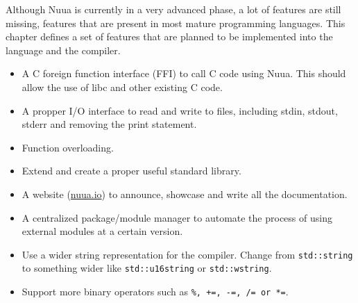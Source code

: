 Although Nuua is currently in a very advanced phase, a lot of features are still missing, features that are present in most
mature programming languages. This chapter defines a set of features that are planned to be implemented into the language and
the compiler.

\begin{itemize}
    \item A C foreign function interface (FFI) to call C code using Nuua. This should allow the use of libc and other existing C code.
    \item A propper I/O interface to read and write to files, including stdin, stdout, stderr and removing the print statement.
    \item Function overloading.
    \item Extend and create a proper useful standard library.
    \item A website (\href{https://nuua.io}{nuua.io}) to announce, showcase and write all the documentation.
    \item A centralized package/module manager to automate the process of using external modules at a certain version.
    \item Use a wider string representation for the compiler. Change from \texttt{std::string} to something wider like
        \texttt{std::u16string} or \texttt{std::wstring}.
    \item Support more binary operators such as \texttt{\%, +=, -=, /= or *=}.
\end{itemize}
